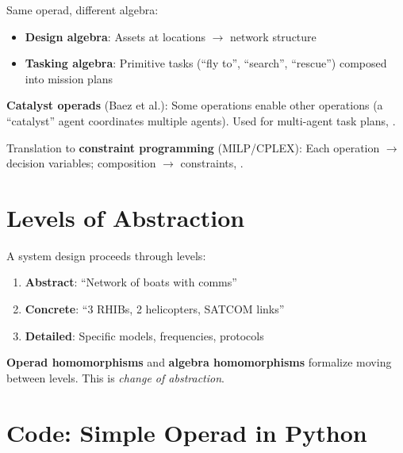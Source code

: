 Same operad, different algebra: \cite{baez2021operads}
\begin{itemize}
    \item \textbf{Design algebra}: Assets at locations $\to$ network structure
    \item \textbf{Tasking algebra}: Primitive tasks (``fly to'', ``search'', ``rescue'') composed into mission plans
\end{itemize}

\textbf{Catalyst operads} (Baez et al.): Some operations enable other operations (a ``catalyst'' agent coordinates multiple agents). Used for multi-agent task plans, \cite{baez2021operads}.

Translation to \textbf{constraint programming} (MILP/CPLEX): Each operation $\to$ decision variables; composition $\to$ constraints, \cite{baez2021operads}.

\section{Levels of Abstraction}
\label{sec:op:abstraction}

A system design proceeds through levels:
\begin{enumerate}
    \item \textbf{Abstract}: ``Network of boats with comms''
    \item \textbf{Concrete}: ``3 RHIBs, 2 helicopters, SATCOM links''
    \item \textbf{Detailed}: Specific models, frequencies, protocols
\end{enumerate}

\textbf{Operad homomorphisms} and \textbf{algebra homomorphisms} formalize moving between levels. This is \emph{change of abstraction}.

\section{Code: Simple Operad in Python}
\label{sec:op:code}

